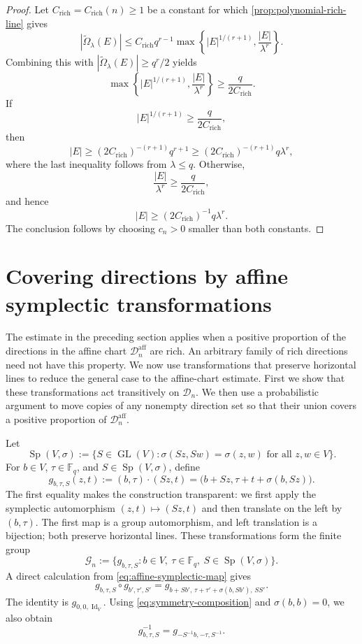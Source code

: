 \documentclass[11pt,letterpaper]{amsart}
\numberwithin{equation}{section}
\theoremstyle{definition}
\theoremstyle{remark}
\newcommand{\Fq}{\mathbb F_q}
\newcommand{\Dn}{\mathcal D_n}
\newcommand{\Sp}{\operatorname{Sp}}
\begin{document}
\begin{proof}
Let $C_{\mathrm{rich}}=C_{\mathrm{rich}}(n)\geq1$ be a constant for which
\cref{prop:polynomial-rich-line} gives
\[
 |\widetilde\Omega_\lambda(E)|
 \leq
 C_{\mathrm{rich}}q^{r-1}
 \max\left\{
 |E|^{1/(r+1)},\frac{|E|}{\lambda^r}
 \right\}.
\]
Combining this with
$|\widetilde\Omega_\lambda(E)|\geq q^r/2$ yields
\[
 \max\left\{
 |E|^{1/(r+1)},\frac{|E|}{\lambda^r}
 \right\}
 \geq
 \frac{q}{2C_{\mathrm{rich}}}.
\]
If
\[
 |E|^{1/(r+1)}
 \geq
 \frac{q}{2C_{\mathrm{rich}}},
\]
then
\[
 |E|
 \geq
 (2C_{\mathrm{rich}})^{-(r+1)}q^{r+1}
 \geq
 (2C_{\mathrm{rich}})^{-(r+1)}q\lambda^r,
\]
where the last inequality follows from $\lambda\leq q$.  Otherwise,
\[
 \frac{|E|}{\lambda^r}
 \geq
 \frac{q}{2C_{\mathrm{rich}}},
\]
and hence
\[
 |E|
 \geq
 (2C_{\mathrm{rich}})^{-1}q\lambda^r.
\]
The conclusion follows by choosing $c_n>0$ smaller than both constants.
\end{proof}



\section{Covering directions by affine symplectic transformations}
\label{sec:covering-directions}


The estimate in the preceding section applies when a positive proportion of the directions in the affine chart $\Dn^{\mathrm{aff}}$ are rich. An arbitrary family of rich directions need not have this property. We now use transformations that preserve horizontal lines to reduce the general case to the affine-chart estimate. First we show that these transformations act transitively on $\Dn$. We then use a probabilistic argument to move copies of any nonempty direction set so that their union covers a positive proportion of $\Dn^{\mathrm{aff}}$.


Let
\[
 \Sp(V,\sigma)
 :=
 \{S\in\operatorname{GL}(V):
   \sigma(Sz,Sw)=\sigma(z,w)\text{ for all }z,w\in V\}.
\]
For $b\in V$, $\tau\in\Fq$, and $S\in\Sp(V,\sigma)$, define
\begin{equation}\label{eq:affine-symplectic-map}
 g_{b,\tau,S}(z,t)
 :=(b,\tau)\cdot(Sz,t)
 =\bigl(b+Sz,\tau+t+\sigma(b,Sz)\bigr).
\end{equation}
The first equality makes the construction transparent: we first apply the symplectic automorphism $(z,t)\mapsto(Sz,t)$ and then translate on the left by $(b,\tau)$. The first map is a group automorphism, and left translation is a bijection; both preserve horizontal lines. These transformations form the finite group
\[
 \mathcal G_n
 :=
 \{g_{b,\tau,S}:b\in V,\ \tau\in\Fq,\ S\in\Sp(V,\sigma)\}.
\]
A direct calculation from \eqref{eq:affine-symplectic-map} gives
\begin{equation}\label{eq:symmetry-composition}
 g_{b,\tau,S}\circ g_{b',\tau',S'}
 =
 g_{b+Sb',\,\tau+\tau'+\sigma(b,Sb'),\,SS'}.
\end{equation}
The identity is $g_{0,0,\operatorname{Id}_V}$.  Using
\eqref{eq:symmetry-composition} and $\sigma(b,b)=0$, we also obtain
\[
 g_{b,\tau,S}^{-1}
 =
 g_{-S^{-1}b,-\tau,S^{-1}}.
\]
\end{document}
